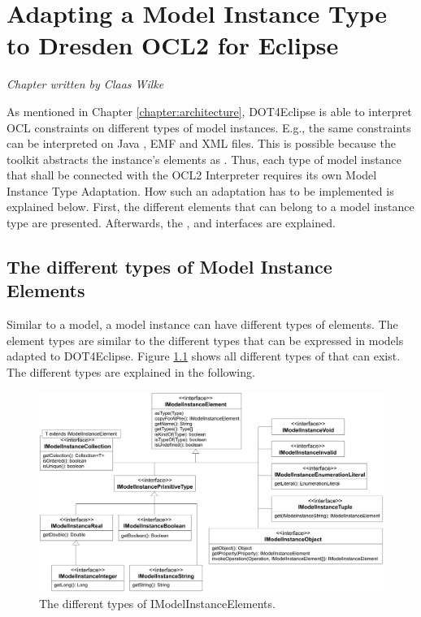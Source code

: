 \chapter{Adapting a Model Instance Type to Dresden OCL2 for Eclipse}
\label{chapter:modelInstanceTypeAdaptation}

\begin{flushright}
\textit{Chapter written by Claas Wilke}
\end{flushright}

As mentioned in Chapter \ref{chapter:architecture}, \acl{DOT4Eclipse} is able to interpret \acs{OCL} constraints on different types of model instances. E.g., the same constraints can be interpreted on Java , \acs{EMF}  and \acs{XML} files. This is possible because the toolkit abstracts the instance's elements as . Thus, each type of model instance that shall be connected with the \acs{OCL}2 Interpreter requires its own Model Instance Type Adaptation. How such an adaptation has to be implemented is explained below. First, the different elements that can belong to a model instance type are presented. Afterwards, the ,  and  interfaces are explained.


\section{The different types of Model Instance Elements}

Similar to a model, a model instance can have different types of elements. The element types are similar to the different types that can be expressed in models adapted to \acl{DOT4Eclipse}. Figure \ref{pic:modelInstanceTypeAdaptation:typeHierarchy} shows all different types of  that can exist. The different types are explained in the following.

\begin{figure}
	\centering
	\includegraphics[width=1.0\linewidth]{figures/modelInstanceTypeAdaptation/typeHierarchy}
	\caption{The different types of IModelInstanceElements.}
	\label{pic:modelInstanceTypeAdaptation:typeHierarchy}
\end{figure}


